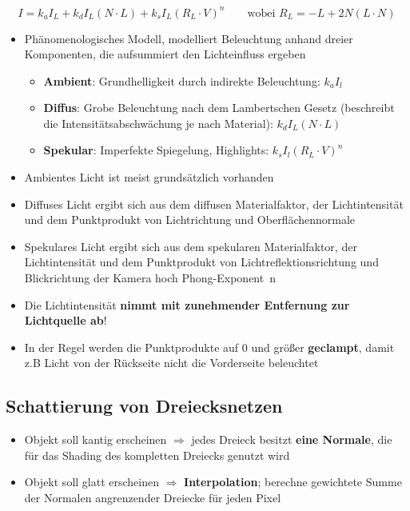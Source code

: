 \documentclass[10pt,a4paper]{article}
\begin{document}
        \[I = k_a I_L + k_d I_L (N \cdot L) + k_s I_L (R_L \cdot V)^n \qquad \text{wobei } R_L = -L + 2N(L \cdot N)\]
	\begin{itemize}
		\item Phänomenologisches Modell, modelliert Beleuchtung anhand dreier Komponenten, die aufsummiert den Lichteinfluss ergeben
		\begin{itemize}
			\item \textbf{Ambient}: Grundhelligkeit durch indirekte Beleuchtung: \(k_a I_l\)
			\item \textbf{Diffus}: Grobe Beleuchtung nach dem Lambertschen Gesetz (beschreibt die Intensitätsabschwächung je nach Material):
                          \(k_d I_L (N \cdot L)\)
			\item \textbf{Spekular}: Imperfekte Spiegelung, \glqq Highlights\grqq:
                          \(k_s I_l (R_L \cdot V)^n\)
		\end{itemize}
		\item Ambientes Licht ist meist grundsätzlich vorhanden
		\item Diffuses Licht ergibt sich aus dem diffusen Materialfaktor, der Lichtintensität und dem Punktprodukt von Lichtrichtung und Oberflächennormale
		\item Spekulares Licht ergibt sich aus dem spekularen Materialfaktor, der Lichtintensität und dem Punktprodukt von Lichtreflektionsrichtung und Blickrichtung der Kamera hoch \glqq Phong-Exponent\grqq\ n
		\item Die Lichtintensität \textbf{nimmt mit zunehmender Entfernung zur Lichtquelle ab}!
		\item In der Regel werden die Punktprodukte auf 0 und größer \textbf{\glqq geclampt\grqq}, damit z.B Licht von der Rückseite nicht die Vorderseite beleuchtet
        \end{itemize}

	\subsection{Schattierung von Dreiecksnetzen}
	\label{rt:sub:schattierung_von_dreiecksnetzen}
	
	\begin{itemize}
		\item Objekt soll kantig erscheinen $\Rightarrow$ jedes Dreieck besitzt \textbf{eine Normale}, die für das Shading des kompletten Dreiecks genutzt wird
		\item Objekt soll glatt erscheinen $\Rightarrow$ \textbf{Interpolation}; berechne gewichtete Summe der Normalen angrenzender Dreiecke für jeden Pixel
	\end{itemize}
\end{document}
